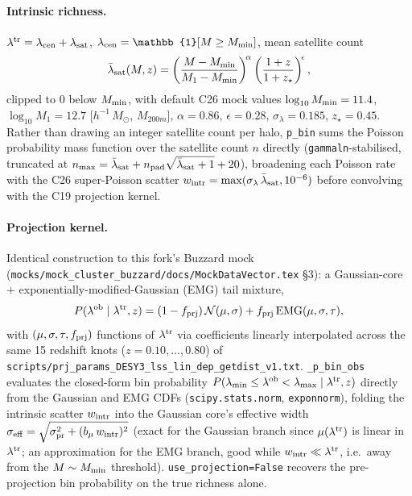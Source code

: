 \documentclass[a4paper, 11pt]{article}
\newcommand{\lob}{\lambda^{\rm ob}}
\newcommand{\ltr}{\lambda^{\rm tr}}
\newcommand{\hMsun}{h^{-1}\,M_{\odot}}
\newcommand{\pyfile}[1]{{\small\texttt{#1}}}
\begin{document}
\paragraph{Intrinsic richness.} $\ltr = \lambda_{\rm cen}+\lambda_{\rm
sat}$, $\lambda_{\rm cen}=\mathbb{1}[M\ge M_{\rm min}]$, mean satellite
count
\begin{equation}
  \bar\lambda_{\rm sat}(M,z) = \left(\frac{M-M_{\rm min}}{M_1-M_{\rm min}}\right)^{\!\alpha}
    \left(\frac{1+z}{1+z_\star}\right)^{\!\epsilon},
\end{equation}
clipped to 0 below $M_{\rm min}$, with default C26 mock values
$\log_{10}M_{\rm min}=11.4$, $\log_{10}M_1=12.7$ [$\hMsun$, $M_{200m}$],
$\alpha=0.86$, $\epsilon=0.28$, $\sigma_\lambda=0.185$, $z_\star=0.45$.
Rather than drawing an integer satellite count per halo,
\texttt{p\_bin} sums the Poisson probability mass function over the
satellite count $n$ directly (\texttt{gammaln}-stabilised, truncated
at $n_{\max}=\bar\lambda_{\rm sat}+n_{\rm pad}\sqrt{\bar\lambda_{\rm
sat}+1}+20$), broadening each Poisson rate with the C26 super-Poisson
scatter $w_{\rm intr}=\max(\sigma_\lambda\,\bar\lambda_{\rm sat},
10^{-6})$ before convolving with the C19 projection kernel.

\paragraph{Projection kernel.} Identical construction to this fork's
Buzzard mock (\pyfile{mocks/mock\_cluster\_buzzard/docs/MockDataVector.tex}
\S3): a Gaussian-core $+$ exponentially-modified-Gaussian (EMG) tail
mixture,
\begin{equation}
  P(\lob\mid\ltr,z) = (1-f_{\rm prj})\,\mathcal N(\mu,\sigma)
    + f_{\rm prj}\,\mathrm{EMG}(\mu,\sigma,\tau),
\end{equation}
with $(\mu,\sigma,\tau,f_{\rm prj})$ functions of $\ltr$ via
coefficients linearly interpolated across the same 15 redshift knots
($z=0.10,\dots,0.80$) of
\pyfile{scripts/prj\_params\_DESY3\_lss\_lin\_dep\_getdist\_v1.txt}.
\texttt{\_p\_bin\_obs} evaluates the closed-form bin probability
$P(\lambda_{\min}\le\lob<\lambda_{\max}\mid\ltr,z)$ directly from the
Gaussian and EMG CDFs (\texttt{scipy.stats.norm}, \texttt{exponnorm}),
folding the intrinsic scatter $w_{\rm intr}$ into the Gaussian core's
effective width $\sigma_{\rm eff}=\sqrt{\sigma_{\rm pr}^2 +
(b_\mu\,w_{\rm intr})^2}$ (exact for the Gaussian branch since
$\mu(\ltr)$ is linear in $\ltr$; an approximation for the EMG branch,
good while $w_{\rm intr}\ll\ltr$, i.e.\ away from the $M\sim M_{\rm
min}$ threshold). \texttt{use\_projection=False} recovers the
pre-projection bin probability on the true richness alone.
\end{document}
